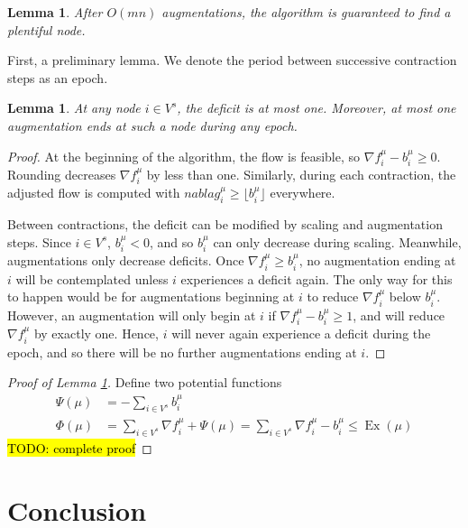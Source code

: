 \documentclass[11pt]{article}
\newtheorem{lemma}[theorem]{Lemma}
\theoremstyle{definition}
\theoremstyle{definition}
\theoremstyle{definition}
\newcommand{\fu}{f^{\mu}}
\newcommand{\nfiu}{\nabla \fu_i}
\newcommand{\biu}{b_{i}^{\mu}}
\newcommand{\vsrc}{V^{s}}
\DeclareMathOperator{\Ex}{Ex}
\renewcommand{\todo}[1]{\hl{TODO: #1}}
\begin{document}
    \begin{lemma} \label{lem.num-aug}
        After $O(mn)$ augmentations, the algorithm is guaranteed to find a plentiful node.
    \end{lemma}
    First, a preliminary lemma. We denote the period between successive contraction
    steps as an epoch.
    \begin{lemma}
    At any node $i \in \vsrc$, the deficit is at most one. Moreover, at most one augmentation
    ends at such a node during any epoch.
    \end{lemma}
    \begin{proof}
        At the beginning of the algorithm, the flow is feasible, so $\nfiu - \biu \geq 0$.
        Rounding decreases $\nfiu$ by less than one. Similarly, during each contraction,
        the adjusted flow is computed with $nabla g_i^\mu \geq \lfloor \biu \rfloor$ everywhere.

        Between contractions, the deficit can be modified by scaling and augmentation steps.
        Since $i \in \vsrc$, $\biu < 0$, and so $\biu$ can only decrease during scaling.
        Meanwhile, augmentations only decrease deficits.
        Once $\nfiu \geq \biu$, no augmentation ending at $i$ will be contemplated unless $i$
        experiences a deficit again. The only way for this to happen would be for
        augmentations beginning at $i$ to reduce $\nfiu$ below $\biu$. However,
        an augmentation will only begin at $i$ if
        $\nfiu - \biu \geq 1$, and will reduce $\nfiu$ by exactly one. Hence, $i$ will
        never again experience a deficit during the epoch, and so there will be no further
        augmentations ending at $i$.
    \end{proof}

    \begin{proof}[Proof of Lemma \ref{lem.num-aug}]
    Define two potential functions
    \begin{align*}
    \Psi(\mu) &= - \sum_{i \in \vsrc} \biu \\
    \Phi(\mu) &= \sum_{i \in \vsrc} \nfiu + \Psi(\mu) = \sum_{i \in \vsrc} \nfiu - \biu
               \leq \Ex(\mu)
    \end{align*}
    \todo{complete proof}
    \end{proof}


\section{Conclusion}\label{sec:discussion} 
\end{document}
